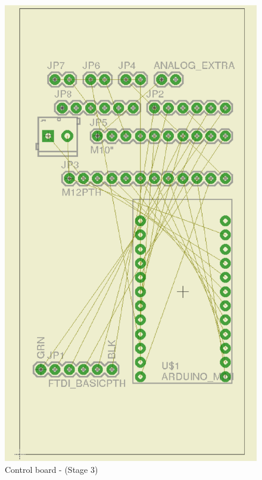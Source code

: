 \documentclass[12pt,a4paper,draft]{report}
\begin{document}
\begin{figure}[H]
\centering
\includegraphics*[scale=0.25]{control_brd_s3}
\caption{Control board -  (Stage 3)}
\label{Control-brd-s3}
\end{figure}
\ \\
\end{document}
